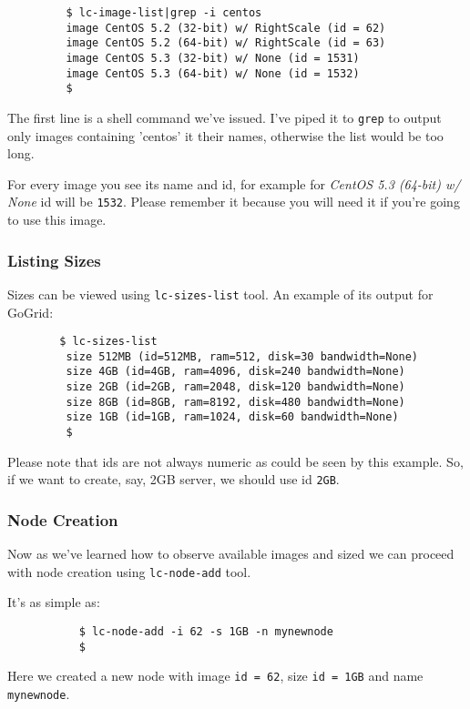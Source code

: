 \documentclass[a4paper]{report}
\begin{document}
		    \begin{verbatim}
		 $ lc-image-list|grep -i centos
		 image CentOS 5.2 (32-bit) w/ RightScale (id = 62)
		 image CentOS 5.2 (64-bit) w/ RightScale (id = 63)
		 image CentOS 5.3 (32-bit) w/ None (id = 1531)
		 image CentOS 5.3 (64-bit) w/ None (id = 1532)
		 $
		    \end{verbatim}

		    The first line is a shell command we've issued. I've piped it to
		 \texttt{grep} to output only images containing 'centos' it their names,
		 otherwise the list would be too long. 

		 For every image you see its name and id, for example for 
		\textit{CentOS 5.3 (64-bit) w/ None} id will be \texttt{1532}. Please
		remember it because you will need it if you're going to use this
		image.

		\subsubsection{Listing Sizes}
		Sizes can be viewed using \texttt{lc-sizes-list} tool. An example of its
		output for GoGrid:

		\begin{verbatim}
		$ lc-sizes-list
	     size 512MB (id=512MB, ram=512, disk=30 bandwidth=None)
	     size 4GB (id=4GB, ram=4096, disk=240 bandwidth=None)
	     size 2GB (id=2GB, ram=2048, disk=120 bandwidth=None)
	     size 8GB (id=8GB, ram=8192, disk=480 bandwidth=None)
	     size 1GB (id=1GB, ram=1024, disk=60 bandwidth=None)
	     $
	       \end{verbatim}

	       Please note that ids are not always numeric as could be seen by this example.
	       So, if we want to create, say, 2GB server, we should use id \texttt{2GB}.

	       \subsubsection{Node Creation}
	       Now as we've learned how to observe available images and sized we can proceed
	       with node creation using \texttt{lc-node-add} tool.

	       It's as simple as:

	       \begin{verbatim}
	       $ lc-node-add -i 62 -s 1GB -n mynewnode
	       $
	       \end{verbatim}

	       Here we created a new node with image \texttt{id = 62}, size
	       \texttt{id = 1GB} and name \texttt{mynewnode}.
\end{document}
